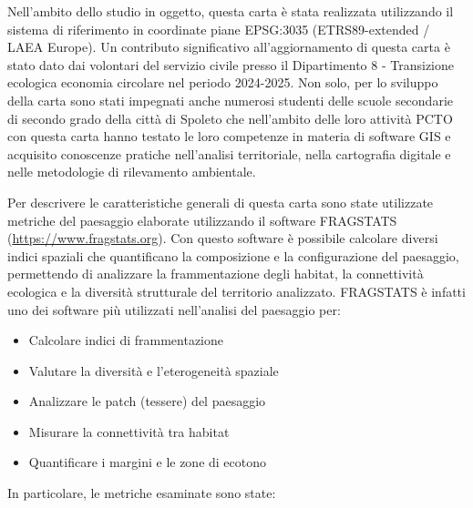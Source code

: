 \documentclass[
]{book}
\providecommand{\tightlist}{%
  \setlength{\itemsep}{0pt}\setlength{\parskip}{0pt}}
\begin{document}
Nell'ambito dello studio in oggetto, questa carta è stata realizzata utilizzando il sistema di riferimento in coordinate piane EPSG:3035 (ETRS89-extended / LAEA Europe).
Un contributo significativo all'aggiornamento di questa carta è stato dato dai volontari del servizio civile presso il Dipartimento 8 - Transizione ecologica economia circolare nel periodo 2024-2025.
Non solo, per lo sviluppo della carta sono stati impegnati anche numerosi studenti delle scuole secondarie di secondo grado della città di Spoleto che nell'ambito delle loro attività PCTO con questa carta hanno testato le loro competenze in materia di software GIS e acquisito conoscenze pratiche nell'analisi territoriale, nella cartografia digitale e nelle metodologie di rilevamento ambientale.

Per descrivere le caratteristiche generali di questa carta sono state utilizzate metriche del paesaggio elaborate utilizzando il software FRAGSTATS (\url{https://www.fragstats.org}).
Con questo software è possibile calcolare diversi indici spaziali che quantificano la composizione e la configurazione del paesaggio, permettendo di analizzare la frammentazione degli habitat, la connettività ecologica e la diversità strutturale del territorio analizzato.
FRAGSTATS è infatti uno dei software più utilizzati nell'analisi del paesaggio per:

\begin{itemize}
\tightlist
\item
  Calcolare indici di frammentazione
\item
  Valutare la diversità e l'eterogeneità spaziale
\item
  Analizzare le patch (tessere) del paesaggio
\item
  Misurare la connettività tra habitat
\item
  Quantificare i margini e le zone di ecotono
\end{itemize}

In particolare, le metriche esaminate sono state:
\end{document}
